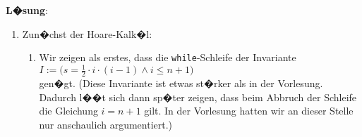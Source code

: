 \documentclass{article}
\renewcommand{\labelenumii}{\arabic{enumii}.}
\begin{document}
\noindent
\textbf{L�sung}:
\begin{enumerate}
\item Zun�chst der Hoare-Kalk�l:
\begin{enumerate}
      \renewcommand{\labelenumii}{\arabic{enumii}.}
\item Wir zeigen als erstes, dass die \texttt{while}-Schleife der Invariante 
      \\[0.2cm]
      \hspace*{1.3cm}
      $I := \bigl(s = \frac{1}{2} \cdot i \cdot (i - 1) \wedge i \leq n + 1\bigr)$ 
      \\[0.2cm]
      gen�gt.  (Diese Invariante ist etwas st�rker als in der Vorlesung.
      Dadurch l��t sich dann sp�ter zeigen, dass beim Abbruch der Schleife
      die Gleichung $i = n+1$ gilt.  In der Vorlesung hatten wir an dieser Stelle nur
      anschaulich argumentiert.)


\end{enumerate}
\end{enumerate}
\end{document}
